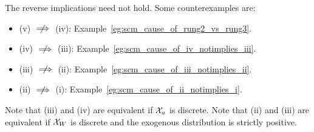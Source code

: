 \begin{Rem}\label{rem:scm_exogenous_input_causes_counterex}
  The reverse implications need not hold. Some counterexamples are: 
  \begin{itemize}
    \item (v) $\notimplies$ (iv): Example~\ref{eg:scm_cause_of_rung2_vs_rung3}.
    \item (iv) $\notimplies$ (iii): Example~\ref{eg:scm_cause_of_iv_notimplies_iii}.
    \item (iii) $\notimplies$ (ii): Example~\ref{eg:scm_cause_of_iii_notimplies_ii}.
    \item (ii) $\notimplies$ (i): Example~\ref{eg:scm_cause_of_ii_notimplies_i}.
  \end{itemize}
  Note that (iii) and (iv) are equivalent if $\mathcal{X}_a$ is discrete.
  Note that (ii) and (iii) are equivalent if $\mathcal{X}_W$ is discrete and the exogenous distribution is strictly positive.
\end{Rem}


